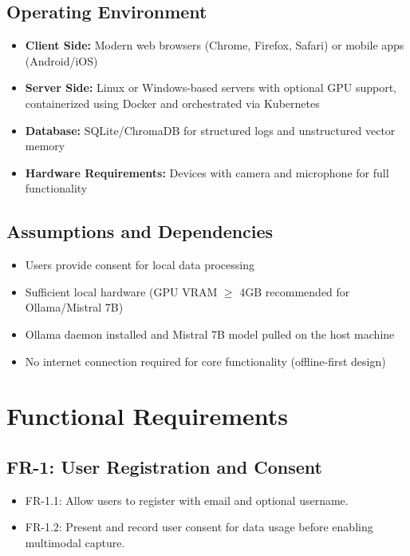 \documentclass[11pt]{report}
\begin{document}
\subsection{Operating Environment}
\begin{itemize}
    \item \textbf{Client Side:} Modern web browsers (Chrome, Firefox, Safari) or mobile apps (Android/iOS)
    \item \textbf{Server Side:} Linux or Windows-based servers with optional GPU support, containerized using Docker and orchestrated via Kubernetes
    \item \textbf{Database:} SQLite/ChromaDB for structured logs and unstructured vector memory
    \item \textbf{Hardware Requirements:} Devices with camera and microphone for full functionality
\end{itemize}

\subsection{Assumptions and Dependencies}
\begin{itemize}
    \item Users provide consent for local data processing
    \item Sufficient local hardware (GPU VRAM $\ge$ 4GB recommended for Ollama/Mistral 7B)
    \item Ollama daemon installed and Mistral 7B model pulled on the host machine
    \item No internet connection required for core functionality (offline-first design)
\end{itemize}

\section{Functional Requirements}

\subsection{FR-1: User Registration and Consent}
\begin{itemize}
    \item FR-1.1: Allow users to register with email and optional username.
    \item FR-1.2: Present and record user consent for data usage before enabling multimodal capture.
\end{itemize}
\end{document}
